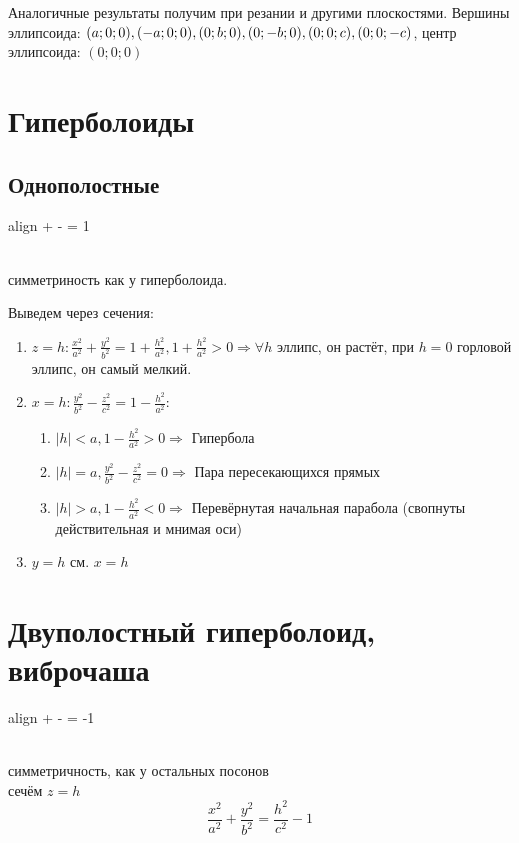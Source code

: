 \documentclass[oneside]{book}
\newcommand{\boxedeq}[2]{\begin{empheq}[box={\fboxsep=6pt\fbox}]{align}\label{#1}#2\end{empheq}}
\begin{document}
\begin{enumerate}
\begin{itemize}
\begin{enumerate}
\begin{enumerate}
\end{enumerate}

Аналогичные результаты получим при резании и другими плоскостями. Вершины эллипсоида: $(a; 0; 0), (-a; 0; 0), (0;b;0), \\ (0;-b;0), (0;0;c), (0;0;-c)$, центр эллипсоида: $(0;0;0)$

\section{Гиперболоиды}

\subsection{Однополостные}

\boxedeq{eq:*}{ +  - \frac{z^2}{c^2} = 1} \\ симметриность как у гиперболоида.

Выведем через сечения:
\begin{enumerate}
\item $ z = h: \frac{x^2}{a^2} + \frac{y^2}{b^2} = 1 + \frac{h^2}{a^2}, 1 + \frac{h^2}{a^2} > 0 \Rightarrow \forall h $ эллипс, он растёт, при $h = 0$ горловой эллипс, он самый мелкий.
\item $x = h: \frac{y^2}{b^2} - \frac{z^2}{c^2} = 1 - \frac{h^2}{a^2}:$ \begin{enumerate}
    \item $|h| < a, 1 - \frac{h^2}{a^2} > 0 \Rightarrow $ Гипербола
    \item $|h| = a, \frac{y^2}{b^2} - \frac{z^2}{c^2} = 0 \Rightarrow $ Пара пересекающихся прямых
    \item $|h| > a, 1 - \frac{h^2}{a^2} < 0 \Rightarrow $ Перевёрнутая начальная парабола (свопнуты действительная и мнимая оси)
  \end{enumerate}
\item $y = h$ см. $x = h$
\end{enumerate}

\section{Двуполостный гиперболоид, виброчаша}

\boxedeq{eq:*}{ +  - \frac{z^2}{c^2} = -1} \\ симметричность, как у остальных посонов \\
сечём $z = h$
\begin{equation}
\frac{x^2}{a^2} + \frac{y^2}{b^2} = \frac{h^2}{c^2} - 1
\end{equation}
\begin{enumerate}


\end{enumerate}
\end{enumerate}
\end{itemize}
\end{enumerate}
\end{document}

